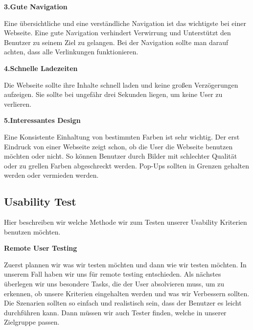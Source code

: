 \textbf{3.Gute Navigation}

Eine übersichtliche und eine verständliche Navigation ist das wichtigste bei einer Webseite.
Eine gute Navigation verhindert Verwirrung und Unterstützt den Benutzer zu seinem Ziel zu gelangen.
Bei der Navigation sollte man darauf achten, dass alle Verlinkungen funktionieren.
\medskip

\textbf{4.Schnelle Ladezeiten}

Die Webseite sollte ihre Inhalte schnell laden und keine großen Verzögerungen
aufzeigen. Sie sollte bei ungefähr drei Sekunden liegen, um keine User zu verlieren.
\medskip

\textbf{5.Interessantes Design}

Eine Konsistente Einhaltung von bestimmten Farben ist sehr wichtig. Der erst Eindruck von
einer Webseite zeigt schon, ob die User die Webseite benutzen möchten oder nicht.
So können Benutzer durch Bilder mit schlechter Qualität oder zu grellen Farben abgeschreckt werden.
Pop-Ups sollten in Grenzen gehalten werden oder vermieden werden.

\subsection{Usability Test}
Hier beschreiben wir welche Methode wir zum Testen unserer Usability Kriterien benutzen 
möchten.
\medskip

\textbf{Remote User Testing}

Zuerst plannen wir was wir testen möchten und dann wie wir testen möchten. In unserem Fall haben wir uns
für remote testing entschieden. Als nächstes überlegen wir uns besondere Tasks, die der User absolvieren muss, um
zu erkennen, ob unsere Kriterien eingehalten werden und was wir Verbessern sollten.
Die Szenarien sollten so einfach und realistisch sein, dass der Benutzer es leicht durchführen kann.
Dann müssen wir auch Tester finden, welche in unserer Zielgruppe passen.


